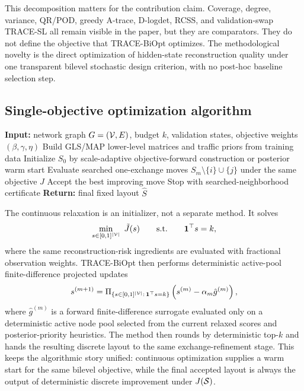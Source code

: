 This decomposition matters for the contribution claim. Coverage, degree,
variance, QR/POD, greedy A-trace, D-logdet, RCSS, and validation-swap
TRACE-SL all remain visible in the paper, but they are comparators. They do
not define the objective that TRACE-BiOpt optimizes. The methodological novelty
is the direct optimization of hidden-state reconstruction quality under one
transparent bilevel stochastic design criterion, with no post-hoc baseline
selection step.

\subsection{Single-objective optimization algorithm}

\begin{algorithm}[t]
\caption{TRACE-BiOpt deterministic layout solver}
\label{alg:trace-biopt}
\begin{algorithmic}[1]
\STATE \textbf{Input:} network graph $G=(\mathcal{V},E)$, budget $k$, validation states, objective weights $(\beta,\gamma,\eta)$
\STATE Build GLS/MAP lower-level matrices and traffic priors from training data
\STATE Initialize $S_0$ by scale-adaptive objective-forward construction or posterior warm start
  \STATE Evaluate searched one-exchange moves $S_m\setminus\{i\}\cup\{j\}$ under the same objective $J$
    \STATE Accept the best improving move
  \ELSE
    \STATE Stop with searched-neighborhood certificate
  \ENDIF
\ENDFOR
\STATE \textbf{Return:} final fixed layout $\hat{S}$
\end{algorithmic}
\end{algorithm}

The continuous relaxation is an initializer, not a separate method. It solves
\[
    \min_{s\in[0,1]^{|\mathcal{V}|}}
    \ \tilde J(s)
    \qquad
    \text{s.t.}\qquad
    \mathbf{1}^{\top}s=k,
\]
where the same reconstruction-risk ingredients are evaluated with fractional
observation weights. TRACE-BiOpt then performs deterministic active-pool
finite-difference projected updates
\[
    s^{(m+1)}
    =
    \Pi_{\{s\in[0,1]^{|\mathcal{V}|}:\,\mathbf{1}^{\top}s=k\}}
    \left(s^{(m)}-\alpha_m\hat g^{(m)}\right),
\]
where $\hat g^{(m)}$ is a forward finite-difference surrogate evaluated only on
a deterministic active node pool selected from the current relaxed scores and
posterior-priority heuristics. The method then rounds by deterministic top-$k$
and hands the resulting discrete layout to
the same exchange-refinement stage. This keeps the algorithmic story unified:
continuous optimization supplies a warm start for the same bilevel objective,
while the final accepted layout is always the output of deterministic discrete
improvement under $J(\mathcal{S})$.

